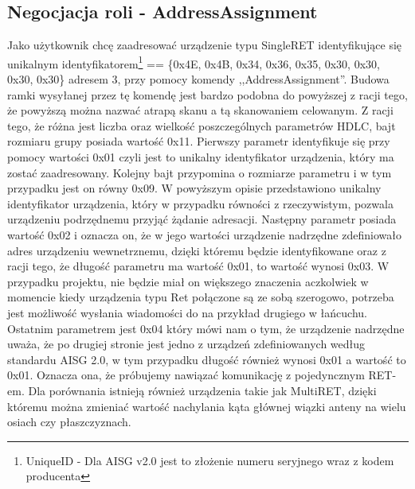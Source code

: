 		\subsection{Negocjacja roli - AddressAssignment}
			Jako użytkownik chcę zaadresować urządzenie typu SingleRET identyfikujące się unikalnym identyfikatorem\footnote{\label{UniqueID} UniqueID - Dla AISG v2.0 jest to złożenie numeru seryjnego wraz z kodem producenta} == \{0x4E, 0x4B, 0x34, 0x36, 0x35, 0x30, 0x30, 0x30, 0x30\} adresem 3, 
			przy pomocy komendy ,,AddressAssignment''.
			\newline\newline
			Budowa ramki wysyłanej przez tę komendę jest bardzo podobna do powyższej z racji tego, że powyższą można nazwać atrapą skanu a tą skanowaniem celowanym.
			Z racji tego, że różna jest liczba oraz wielkość poszczególnych parametrów HDLC, bajt rozmiaru grupy posiada wartość 0x11.
			\newline
			Pierwszy parametr identyfikuje się przy pomocy wartości 0x01 czyli jest to unikalny identyfikator urządzenia, który ma zostać zaadresowany.
			Kolejny bajt przypomina o rozmiarze parametru i w tym przypadku jest on równy 0x09. W powyższym opisie przedstawiono unikalny identyfikator urządzenia, który w przypadku
			równości z rzeczywistym, pozwala urządzeniu podrzędnemu przyjąć żądanie adresacji.
			\newline
			Następny parametr posiada wartość 0x02 i oznacza on, że w jego wartości urządzenie nadrzędne zdefiniowało adres urządzeniu wewnetrznemu, dzięki któremu
			będzie identyfikowane oraz z racji tego, że długość parametru ma wartość 0x01, to wartość wynosi 0x03. W przypadku projektu, nie będzie miał on większego znaczenia
			aczkolwiek w momencie kiedy urządzenia typu Ret połączone są ze sobą szerogowo, potrzeba jest możliwość wysłania wiadomości do na przykład drugiego w łańcuchu.
			\newline
			Ostatnim parametrem jest 0x04 który mówi nam o tym, że urządzenie nadrzędne uważa, że po drugiej stronie jest jedno z urządzeń zdefiniowanych 
			według standardu AISG 2.0, w tym przypadku długość również wynosi 0x01 a wartość to 0x01. Oznacza ona, że próbujemy nawiązać komunikację z pojedyncznym RET-em.
			Dla porównania istnieją również urządzenia takie jak MultiRET, dzięki któremu można zmieniać wartość nachylania kąta głównej wiązki anteny na wielu osiach czy płaszczyznach.
